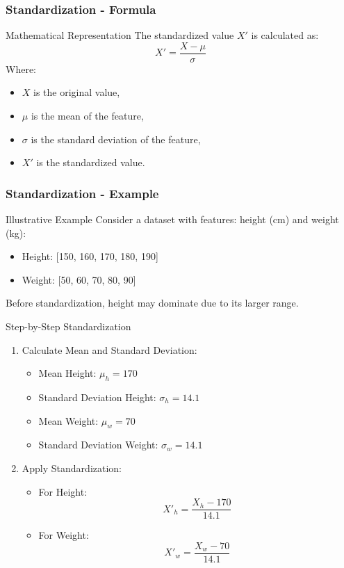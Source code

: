 \documentclass[aspectratio=169]{beamer}
\begin{document}
\begin{frame}[fragile]
    \frametitle{Standardization - Formula}
    \begin{block}{Mathematical Representation}
        The standardized value \(X'\) is calculated as:
        \[
        X' = \frac{X - \mu}{\sigma}
        \]
        Where:
        \begin{itemize}
            \item \(X\) is the original value,
            \item \(\mu\) is the mean of the feature,
            \item \(\sigma\) is the standard deviation of the feature,
            \item \(X'\) is the standardized value.
        \end{itemize}
    \end{block}
\end{frame}

\begin{frame}[fragile]
    \frametitle{Standardization - Example}
    \begin{block}{Illustrative Example}
        Consider a dataset with features: height (cm) and weight (kg):
        \begin{itemize}
            \item Height: [150, 160, 170, 180, 190]
            \item Weight: [50, 60, 70, 80, 90]
        \end{itemize}
        Before standardization, height may dominate due to its larger range.
    \end{block}

    \begin{block}{Step-by-Step Standardization}
        \begin{enumerate}
            \item Calculate Mean and Standard Deviation:
            \begin{itemize}
                \item Mean Height: \(\mu_h = 170\)
                \item Standard Deviation Height: \(\sigma_h = 14.1\)
                \item Mean Weight: \(\mu_w = 70\)
                \item Standard Deviation Weight: \(\sigma_w = 14.1\)
            \end{itemize}
            \item Apply Standardization:
            \begin{itemize}
                \item For Height: 
                \[
                X'_h = \frac{X_h - 170}{14.1}
                \]
                \item For Weight: 
                \[
                X'_w = \frac{X_w - 70}{14.1}
                \]
            \end{itemize}
        \end{enumerate}
    \end{block}
\end{frame}
\end{document}
